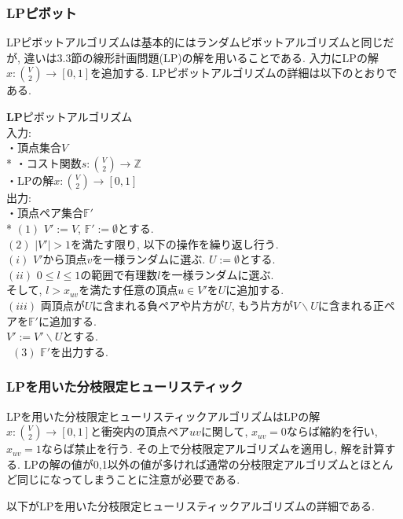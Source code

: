 \documentclass[10.5,a4paper,titlepage, dvipdfmx]{bxjsarticle}
\begin{document}
\subsubsection{LPピボット}
LPピボットアルゴリズムは基本的にはランダムピボットアルゴリズムと同じだが, 違いは3.3節の線形計画問題(LP)の解を用いることである.
入力にLPの解$x:\binom{V}{2} \rightarrow [0,1]$を追加する.
LPピボットアルゴリズムの詳細は以下のとおりである.

\begin{screen}
    $\textbf{LPピボットアルゴリズム}$ \\
    入力: \\
    \hspace{15pt} ・頂点集合$V$\\*
    \hspace{15pt} ・コスト関数$s:\binom{V}{2} \rightarrow \mathbb{Z}$\\
    \hspace{15pt} ・LPの解$x: \binom{V}{2} \rightarrow [0,1]$\\
    出力: \\
    \hspace{15pt} ・頂点ペア集合$\mathbb{F'}$\\*
    $(1)$ $V':=V$, $\mathbb{F'} := \emptyset$とする.\\
    $(2)$ $|V'| > 1$を満たす限り, 以下の操作を繰り返し行う.\\
    \hspace{15pt} $(i)$ $V'$から頂点$v$を一様ランダムに選ぶ. $U := \emptyset$とする.\\
    \hspace{15pt} $(ii)$ $0 \le l \le 1$の範囲で有理数$l$を一様ランダムに選ぶ.\\
    \hspace{15pt} \hspace{15pt} そして, $l > x_{uv}$を満たす任意の頂点$u \in V'$を$U$に追加する.\\
    \hspace{15pt} $(iii)$ 両頂点が$U$に含まれる負ペアや片方が$U$, もう片方が$V \backslash U$に含まれる正ペアを$\mathbb{F'}$に追加する.\\
    \hspace{15pt} \hspace{15pt} $V':=V' \backslash U$とする.\\\
    $(3)$ $\mathbb{F'}$を出力する.
\end{screen}

\subsubsection{LPを用いた分枝限定ヒューリスティック}
LPを用いた分枝限定ヒューリスティックアルゴリズムはLPの解$x:\binom{V}{2} \rightarrow [0,1]$と衝突内の頂点ペア$uv$に関して, $x_{uv}=0$ならば縮約を行い, $x_{uv}=1$ならば禁止を行う.
その上で分枝限定アルゴリズムを適用し, 解を計算する.
LPの解の値が0,1以外の値が多ければ通常の分枝限定アルゴリズムとほとんど同じになってしまうことに注意が必要である.\par
以下がLPを用いた分枝限定ヒューリスティックアルゴリズムの詳細である.
\end{document}
